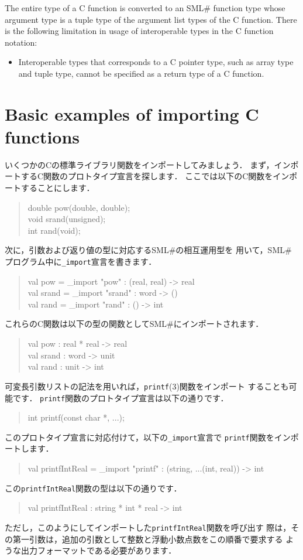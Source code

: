 \documentclass{jbook}
\newif\ifjp
\newcommand{\txt}[2]{#2}
\newcommand{\smlsharp}{SML\#}
\newenvironment{program}{\begin{quote}\begin{tt}}%
                        {\end{tt}\end{quote}}
\begin{document}
	The entire type of a C function is converted to an \smlsharp{}
function type whose argument type is a tuple type of the argument list types
of the C function.
	There is the following limitation in usage of interoperable types
in the C function notation:
\begin{itemize}
\item
	Interoperable types that corresponds to a C pointer type, such as
array type and tuple type, cannot be specified as a return type of
a C function.
\end{itemize}

\fi%

\section{\txt{基本的なC関数のインポート例}
             {Basic examples of importing C functions}}

\ifjp%

	いくつかのCの標準ライブラリ関数をインポートしてみましょう．
	まず，インポートするC関数のプロトタイプ宣言を探します．
	ここでは以下のC関数をインポートすることにします．
\begin{program}
double pow(double, double);\\
void srand(unsigned);\\
int rand(void);
\end{program}
	次に，引数および返り値の型に対応する\smlsharp{}の相互運用型を
用いて，\smlsharp{}プログラム中に{\tt \_import}宣言を書きます．
\begin{program}
val pow = \_import "pow" : (real, real) -> real\\
val srand = \_import "srand" : word -> ()\\
val rand = \_import "rand" : () -> int
\end{program}
	これらのC関数は以下の型の関数として\smlsharp{}にインポートされます．
\begin{program}
val pow : real * real -> real\\
val srand : word -> unit\\
val rand : unit -> int
\end{program}

	可変長引数リストの記法を用いれば，{\tt printf}(3)関数をインポート
することも可能です．
	{\tt printf}関数のプロトタイプ宣言は以下の通りです．
\begin{program}
int printf(const char *, ...);
\end{program}
	このプロトタイプ宣言に対応付けて，以下の{\tt \_import}宣言で
{\tt printf}関数をインポートします．
\begin{program}
val printfIntReal = \_import "printf" : (string, ...(int, real)) -> int
\end{program}
	この{\tt printfIntReal}関数の型は以下の通りです．
\begin{program}
val printfIntReal : string * int * real -> int
\end{program}
	ただし，このようにしてインポートした{\tt printfIntReal}関数を呼び出す
際は，その第一引数は，追加の引数として整数と浮動小数点数をこの順番で要求する
ような出力フォーマットである必要があります．
\end{document}
